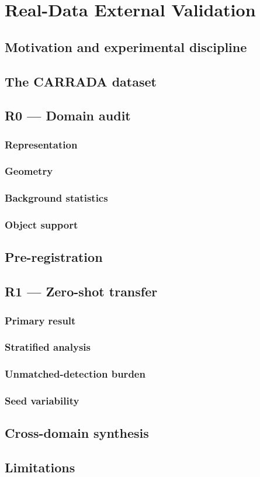\chapter{Real-Data External Validation}
\label{ch:realdata}

\section{Motivation and experimental discipline}
\section{The CARRADA dataset}
\section{R0 --- Domain audit}
\subsection{Representation}
\subsection{Geometry}
\subsection{Background statistics}
\subsection{Object support}
\section{Pre-registration}
\section{R1 --- Zero-shot transfer}
\subsection{Primary result}
\subsection{Stratified analysis}
\subsection{Unmatched-detection burden}
\subsection{Seed variability}
\section{Cross-domain synthesis}
\section{Limitations}

